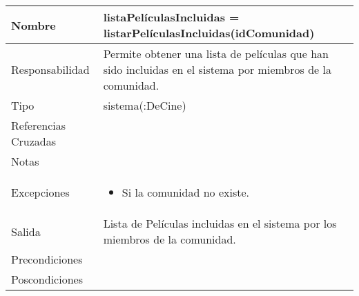 \documentclass{article}
\begin{document}
\begin{table}[h]
\begin{tabular}{|l|l|l|l|l|l|}
\hline
\multicolumn{2}{|p{3cm}|}{Nombre} & \multicolumn{4}{p{10cm}|}{\textbf{listaPelículasIncluidas = listarPelículasIncluidas(idComunidad)}}\\
\hline
\multicolumn{2}{|p{3cm}|}{Responsabilidad} & \multicolumn{4}{p{10cm}|}{Permite obtener una lista de películas que han sido incluidas en el sistema por miembros de la comunidad.} \\
\hline
\multicolumn{2}{|p{3cm}|}{Tipo} & \multicolumn{4}{p{10cm}|}{sistema(:DeCine)} \\
\hline
\multicolumn{2}{|p{3cm}|}{Referencias Cruzadas} & \multicolumn{4}{p{10cm}|}{} \\
\hline
\multicolumn{2}{|p{3cm}|}{Notas} & \multicolumn{4}{p{10cm}|}{} \\
\hline
\multicolumn{2}{|p{3cm}|}{Excepciones} & \multicolumn{4}{p{10cm}|}{\begin{itemize}
\item Si la comunidad no existe.
\end{itemize}} \\
\hline
\multicolumn{2}{|p{3cm}|}{Salida} & \multicolumn{4}{p{10cm}|}{Lista de Películas incluidas en el sistema por los miembros de la comunidad.} \\
\hline
\multicolumn{2}{|p{3cm}|}{Precondiciones} & \multicolumn{4}{p{10cm}|}{} \\
\hline
\multicolumn{2}{|p{3cm}|}{Poscondiciones} & \multicolumn{4}{p{10cm}|}{} \\
\hline
\end{tabular}
\end{table}
	
\end{document}

